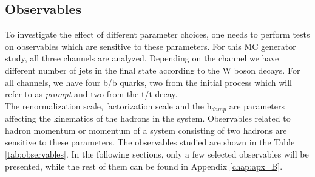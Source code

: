 \subsection{Observables}
\noindent To investigate the effect of different parameter choices, one needs to perform tests on observables which are sensitive to these parameters. For this MC generator study, all three channels are analyzed. Depending on the channel we have different number of jets in the final state according to the W boson decays. For all channels, we have four b/$\overline{\text{b}}$ quarks, two from the initial process which will refer to as \textit{prompt} and two from the t/$\overline{\text{t}}$ decay.\\
\indent The renormalization scale, factorization scale and the h$_{damp}$ are parameters affecting the kinematics of the hadrons in the system. Observables related to hadron momentum or momentum of a system consisting of two hadrons are sensitive to these parameters. The observables studied are shown in the Table \ref{tab:observables}. In the following sections, only a few selected observables will be presented, while the rest of them can be found in Appendix \ref{chap:apx_B}.
